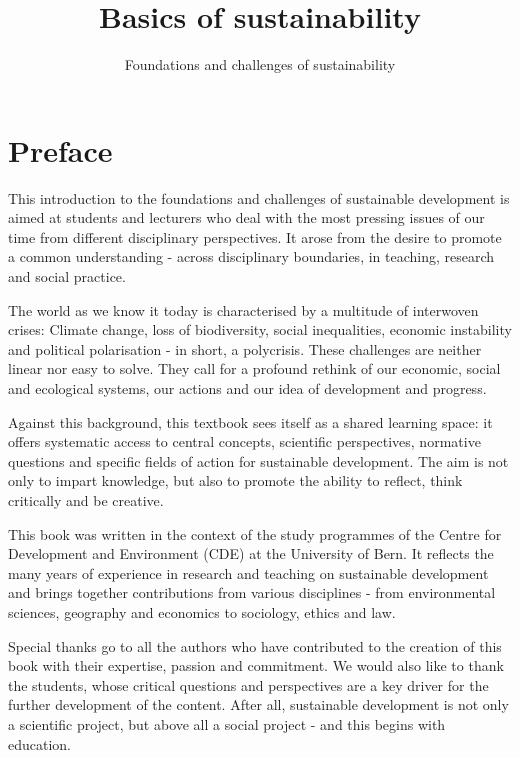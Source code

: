 \documentclass[
  a4paper,
  openany]{book}
\title{Basics of sustainability}
\subtitle{Foundations and challenges of sustainability}
\author{}
\date{}
\renewcommand*\contentsname{Table of contents}
\newcommand\contentsname{Table of contents}
\begin{document}
\frontmatter
\maketitle

\renewcommand*\contentsname{Table of contents}
{
\hypersetup{linkcolor=}
\setcounter{tocdepth}{2}
\tableofcontents
}

\mainmatter
{}

\chapter*{Preface}\label{preface}


This introduction to the foundations and challenges of sustainable
development is aimed at students and lecturers who deal with the most
pressing issues of our time from different disciplinary perspectives. It
arose from the desire to promote a common understanding - across
disciplinary boundaries, in teaching, research and social practice.

The world as we know it today is characterised by a multitude of
interwoven crises: Climate change, loss of biodiversity, social
inequalities, economic instability and political polarisation - in
short, a polycrisis. These challenges are neither linear nor easy to
solve. They call for a profound rethink of our economic, social and
ecological systems, our actions and our idea of development and
progress.

Against this background, this textbook sees itself as a shared learning
space: it offers systematic access to central concepts, scientific
perspectives, normative questions and specific fields of action for
sustainable development. The aim is not only to impart knowledge, but
also to promote the ability to reflect, think critically and be
creative.

This book was written in the context of the study programmes of the
Centre for Development and Environment (CDE) at the University of Bern.
It reflects the many years of experience in research and teaching on
sustainable development and brings together contributions from various
disciplines - from environmental sciences, geography and economics to
sociology, ethics and law.

Special thanks go to all the authors who have contributed to the
creation of this book with their expertise, passion and commitment. We
would also like to thank the students, whose critical questions and
perspectives are a key driver for the further development of the
content. After all, sustainable development is not only a scientific
project, but above all a social project - and this begins with
education.
\end{document}
